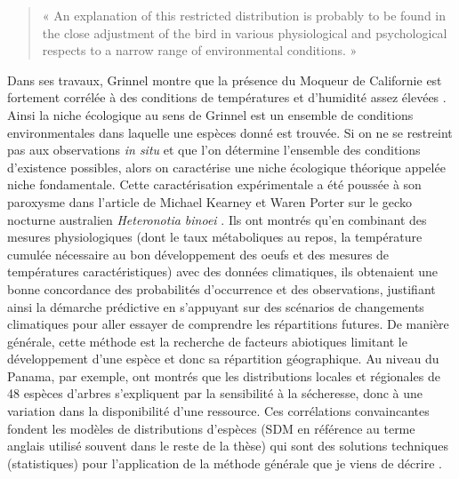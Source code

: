 \begin{quote}
« An explanation of this restricted distribution is probably to be found
in the close adjustment of the bird in various physiological and
psychological respects to a narrow range of environmental conditions. »
\end{quote}

Dans ses travaux, Grinnel montre que la présence du Moqueur de
Californie est fortement corrélée à des conditions de températures et
d'humidité assez élevées \citep{Grinnell1917a}. Ainsi la niche
écologique au sens de Grinnel est un ensemble de conditions
environmentales dans laquelle une espèces donné est trouvée. Si on ne se
restreint pas aux observations \emph{in situ} et que l'on détermine
l'ensemble des conditions d'existence possibles, alors on caractérise
une niche écologique théorique appelée niche fondamentale. Cette
caractérisation expérimentale a été poussée à son paroxysme dans
l'article de Michael Kearney et Waren Porter sur le gecko nocturne
australien \emph{Heteronotia binoei} \citep{Kearney2004}. Ils ont
montrés qu'en combinant des mesures physiologiques (dont le taux
métaboliques au repos, la température cumulée nécessaire au bon
développement des oeufs et des mesures de températures caractéristiques)
avec des données climatiques, ils obtenaient une bonne concordance des
probabilités d'occurrence et des observations, justifiant ainsi la
démarche prédictive en s'appuyant sur des scénarios de changements
climatiques pour aller essayer de comprendre les répartitions futures.
De manière générale, cette méthode est la recherche de facteurs
abiotiques limitant le développement d'une espèce et donc sa répartition
géographique. Au niveau du Panama, par exemple, \citet{Engelbrecht2007}
ont montrés que les distributions locales et régionales de 48 espèces
d'arbres s'expliquent par la sensibilité à la sécheresse, donc à une
variation dans la disponibilité d'une ressource. Ces corrélations
convaincantes fondent les modèles de distributions d'espèces (SDM en
référence au terme anglais utilisé souvent dans le reste de la thèse)
qui sont des solutions techniques (statistiques) pour l'application de
la méthode générale que je viens de décrire
\citep[\citet{Elith2009a}]{Elith2006}.

